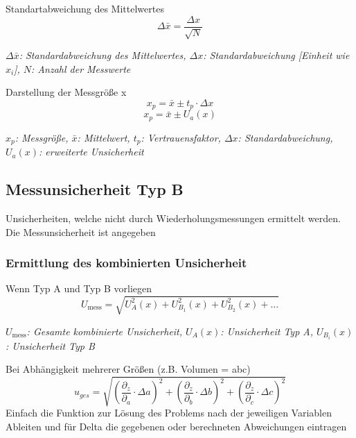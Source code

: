 \documentclass[a4paper,10pt]{article}
\newenvironment{displayformula}
{
	\begin{framed}
		\color{formulaColor}
	}
	{\end{framed}}
\newcommand{\formulalegend}[1]{%
	\par\vspace{0.5ex}%
	{{\color{legendColor}\RaggedRight\small\textit{#1}}}%
	\par\vspace{1.5ex}%
}
\begin{document}
	\begin{displayformula}
		Standartabweichung des Mittelwertes
		\[
		\Delta \bar{x} = \frac{\Delta x}{\sqrt{N}} 
		\]	
	\end{displayformula}
	\formulalegend{
		\( \Delta \bar{x} \): Standardabweichung des Mittelwertes, \( \Delta x \): Standardabweichung [Einheit wie \( x_i \)], \( N \): Anzahl der Messwerte
	}
	
	\begin{displayformula}
		Darstellung der Messgröße x
		\[
		x_p = \bar{x} \pm t_p \cdot \Delta x
		\]
		\[
		x_p = \bar{x} \pm U_a (x)
		\]
	\end{displayformula}
	\formulalegend{
		\( x_p \): Messgröße, \( \bar{x} \): Mittelwert, \( t_p \): Vertrauensfaktor, \( \Delta x \): Standardabweichung, \( U_a(x) \): erweiterte Unsicherheit
	}
	
	\subsection{Messunsicherheit Typ B}
	\begin{displayformula}
		Unsicherheiten, welche nicht durch Wiederholungsmessungen ermittelt werden. \\ Die Messunsicherheit ist angegeben
	\end{displayformula}
	
	\subsubsection{Ermittlung des kombinierten Unsicherheit}
	
	\begin{displayformula}
		Wenn Typ A und Typ B vorliegen
		\[
		U_\text{mess} = \sqrt{U^2_A(x) + U^2_{B_1}(x) + U^2_{B_2}(x) + \dots}
		\]
	\end{displayformula}
	\formulalegend{
		\( U_\text{mess} \): Gesamte kombinierte Unsicherheit, \( U_A(x) \): Unsicherheit Typ A, \( U_{B_i}(x) \): Unsicherheit Typ B
	}
	
	\begin{displayformula}
		Bei Abhängigkeit mehrerer Größen (z.B. Volumen = abc)
		\[
		u_{ges} = \sqrt{(\frac{\partial_z}{\partial_a} \cdot \Delta a)^2 + (\frac{\partial_z}{\partial_b} \cdot \Delta b)^2 + (\frac{\partial_z}{\partial_c} \cdot \Delta c)^2 }
		\]
		Einfach die Funktion zur Lösung des Problems nach der jeweiligen Variablen Ableiten und für Delta die gegebenen oder berechneten Abweichungen eintragen
	\end{displayformula}
	
\end{document}
